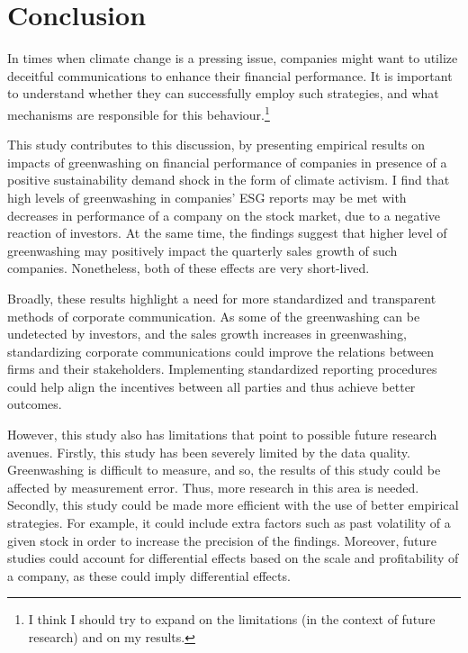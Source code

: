 \documentclass[12pt]{article}
\begin{document}
\section{Conclusion}\label{sect:discussion}


In times when climate change is a pressing issue, companies might want to utilize deceitful communications to enhance their financial performance. It is important to understand whether they can successfully employ such strategies, and what mechanisms are responsible for this behaviour.\footnote{I think I should try to expand on the limitations (in the context of future research) and on my results.}

This study contributes to this discussion, by presenting empirical results on impacts of greenwashing on financial performance of companies in presence of a positive sustainability demand shock in the form of climate activism. I find that high levels of greenwashing in companies' ESG reports may be met with decreases in performance of a company on the stock market, due to a negative reaction of investors. At the same time, the findings suggest that higher level of greenwashing may positively impact the quarterly sales growth of such companies. Nonetheless, both of these effects are very short-lived. 

Broadly, these results highlight a need for more standardized and transparent methods of corporate communication. As some of the greenwashing can be undetected by investors, and the sales growth increases in greenwashing, standardizing corporate communications could improve the relations between firms and their stakeholders. Implementing standardized reporting procedures could help align the incentives between all parties and thus achieve better outcomes. 

However, this study also has limitations that point to possible future research avenues. Firstly, this study has been severely limited by the data quality. Greenwashing is difficult to measure, and so, the results of this study could be affected by measurement error. Thus, more research in this area is needed. Secondly, this study could be made more efficient with the use of better empirical strategies. For example, it could include extra factors such as past volatility of a given stock in order to increase the precision of the findings. Moreover, future studies could account for differential effects based on the scale and profitability of a company, as these could imply differential effects. 
\end{document}
